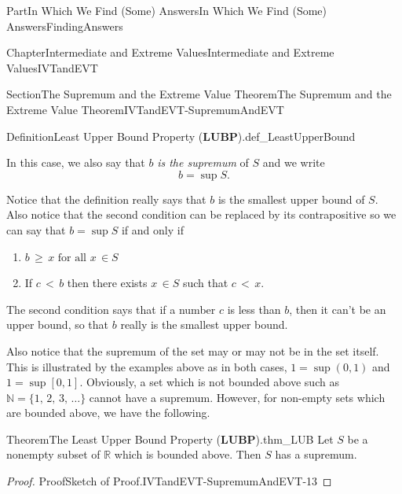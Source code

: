 \documentclass[oneside,10pt,]{book}
\newcommand{\terminology}[1]{\textbf{#1}}
\numberwithin{equation}{part}
\newcommand{\lt}{<}
\begin{document}
\begin{partptx}{Part}{In Which We Find (Some) Answers}{}{In Which We Find (Some) Answers}{}{}{FindingAnswers}
\begin{chapterptx}{Chapter}{Intermediate and Extreme Values}{}{Intermediate and Extreme Values}{}{}{IVTandEVT}
\begin{sectionptx}{Section}{The Supremum and the Extreme Value Theorem}{}{The Supremum and the Extreme Value Theorem}{}{}{IVTandEVT-SupremumAndEVT}
\begin{definition}{Definition}{Least Upper Bound Property (\terminology{LUBP}).}{def_LeastUpperBound}
\begin{enumerate}[label={(\alph*)}]
\end{enumerate}
%
\par
In this case, we also say that \(b\) \emph{is the supremum} of \(S\) and we write%
\begin{equation*}
b=\sup S\text{.}
\end{equation*}
%
\end{definition}
Notice that the definition really says that \(b\) is the smallest upper bound of \(S\). Also notice that the second condition can be replaced by its contrapositive so we can say that \(b=\sup S\) if and only if%
\begin{enumerate}[label={(\alph*)}]
\item{}\(\displaystyle b\,\geq\,x\text{ for all } x\,\in S\)%
\item{}If \(c\,\lt \,b\) then there exists \(x\,\in S\) such that \(c\,\lt \,x\).%
\end{enumerate}
%
\par
The second condition says that if a number \(c\) is less than \(b\), then it can't be an upper bound, so that \(b\) really is the smallest upper bound.%
\par
Also notice that the supremum of the set may or may not be in the set itself. This is illustrated by the examples above as in both cases, \(1=\sup(0,1)\) and \(1=\sup [0,1]\). Obviously, a set which is not bounded above such as \(\mathbb{N}=\{1,\,2,\,3,\,\ldots\}\) cannot have a supremum. However, for non-empty sets which are bounded above, we have the following.%
\begin{theorem}{Theorem}{The Least Upper Bound Property (\terminology{LUBP}).}{}{thm_LUB}%
%
Let \(S\) be a non\textendash{}empty subset of \(\mathbb{R}\) which is bounded above. Then \(S\) has a supremum.%
\end{theorem}
\begin{proof}{Proof}{Sketch of Proof.}{IVTandEVT-SupremumAndEVT-13}

\end{proof}
\end{sectionptx}
\end{chapterptx}
\end{partptx}
\end{document}
